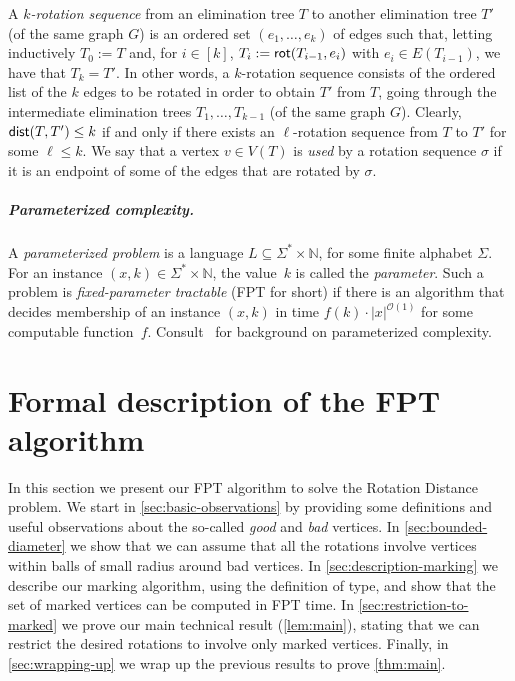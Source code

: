 \documentclass[a4paper,UKenglish,cleveref, autoref, thm-restate]{lipics-v2021}
\newcommand{\rot}{{\sf rot}\xspace}
\newcommand{\dist}{{\sf dist}\xspace}
\newcommand{\Ocal}{{\mathcal O}\xspace}
\newcommand{\FPT}{{\sf FPT}\xspace}
\newcommand{\kelimination}{{\sc Rotation Distance}\xspace}
\begin{document}
A \textit{$k$-rotation sequence} from an elimination tree $T$ to another elimination tree $T'$ (of the same graph $G$) is an ordered set $(e_1,\ldots,e_k)$ of edges such that, letting inductively $T_0 := T$ and, for $i \in [k]$, $T_i:= \rot(T_{i-1},e_i)$ with $e_i \in E(T_{i-1})$, we have that $T_k=T'$. In other words, a $k$-rotation sequence consists of the ordered list of the $k$ edges to be rotated in order to obtain $T'$ from $T$, going through the intermediate elimination trees $T_1, \ldots, T_{k-1}$ (of the same graph $G$). Clearly, $\dist(T,T') \leq k$ if and only if there exists an $\ell$-rotation sequence from $T$ to $T'$ for some $\ell \leq k$. We say that a vertex $v \in V(T)$ is \emph{used} by a rotation sequence $\sigma$ if it is an endpoint of some of the edges that are rotated by $\sigma$.

\subparagraph*{Parameterized complexity.}  A \emph{parameterized problem} is a language $L \subseteq \Sigma^* \times \mathbb{N}$, for some finite alphabet $\Sigma$.  For an instance $(x,k) \in \Sigma^* \times \mathbb{N}$, the value~$k$ is called the \emph{parameter}. Such a problem is \emph{fixed-parameter tractable} (\FPT for short) if there is an algorithm that decides membership of an instance $(x, k)$ in time $f(k)\cdot {|x|}^{\Ocal(1)}$ for some computable function~$f$. Consult~\cite{CyganFKLMPPS15,Niedermeier06,FlumG06,DoFe13,FominLSZ19} for background on parameterized complexity.


\section{Formal description of the \FPT algorithm}
\label{sec:description-algorithm}

In this section we present our \FPT algorithm to solve the \kelimination problem. We start in \autoref{sec:basic-observations} by providing some definitions and  useful  observations about the so-called \emph{good} and \emph{bad} vertices. In \autoref{sec:bounded-diameter} we show that we can assume that all the rotations involve vertices within balls of small radius around bad vertices. In \autoref{sec:description-marking} we describe our marking algorithm, using the definition of type, and show that the set of marked vertices can be computed in \FPT time. In \autoref{sec:restriction-to-marked} we prove our main technical result (\autoref{lem:main}), stating that we can restrict the desired rotations to involve only marked vertices.
Finally, in \autoref{sec:wrapping-up} we wrap up the previous results to prove \autoref{thm:main}.
\end{document}
